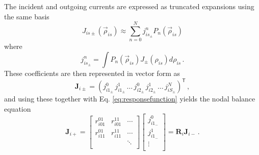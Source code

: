 The incident and outgoing currents are expressed as
truncated expansions using the same basis
\begin{equation}
  J_{is\pm}(\vec{\rho}_{is}) \approx \sum^{N}_{n=0}  
    j^n_{is_\pm} P_n (\vec{\rho}_{is}) 
\end{equation}
where
\begin{equation}
      j^n_{is_\pm} = \int  P_n (\vec{\rho}_{is}) 
        J_{\pm} (\rho_{is}) d \rho_{is} \, .
\end{equation}
These coefficients are then represented in vector form as
\begin{equation}
  \mathbf{J}_{i\pm} = ( j^0_{i1_\pm} \, j^1_{i1_\pm} \, \ldots \, 
    j^0_{i2_\pm} \, j^1_{i2_\pm} \, \ldots \, j^N_{iS_\pm} )^\mathsf{T} \, ,
\end{equation}
and using these together with Eq. \ref{eq:responsefunction} yields
the nodal balance equation
\begin{equation}
    \mathbf{J}_{i+} = 
     \left [\begin{array}{ccc}
       r^{01}_{i01} &  r^{11}_{i01}  &  \cdots   \\
       r^{01}_{i11} &  r^{11}_{i11}  &  \cdots   \\
                    &                &  \ddots   \\
    \end{array} 
    \right ] \left [\begin{array}{c}
      j^0_{i1_-}       \\
      j^1_{i1_-}       \\
      \vdots           \\
    \end{array} 
    \right ] = \mathbf{R}_i\mathbf{J}_{i-} \, .
  \label{eq:elementresponse}
\end{equation}

